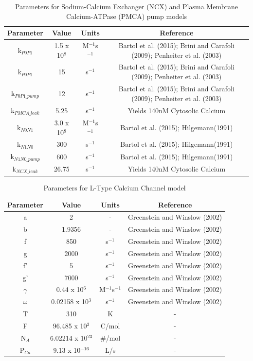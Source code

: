 \documentclass[12pt]{ucsddissertation}
\begin{document}
\begin{table}[h]
\centering
\caption{Parameters for Sodium-Calcium Exchanger (NCX) 
and Plasma Membrane Calcium-ATPase (PMCA) pump models}
\begin{tabular}{cccc}
\hline
\textbf{Parameter} & \textbf{Value} & \textbf{Units} & \textbf{
Reference} \\
\hline
k$_{P0P1}$ & 1.5 x 10$^{8}$ & M$^{-1}$s$^{-1}$ & Bartol et 
al. (2015); Brini and Carafoli (2009); Penheiter et al. (2003) \\
\hline
k$_{P0P1}$ & 15 & s$^{-1}$ & Bartol et al. (2015); Brini and 
Carafoli (2009); Penheiter et al. (2003) \\
\hline
k$_{P0P1\_pump}$ & 12 & s$^{-1}$ & Bartol et al. (2015); Brini and 
Carafoli (2009); Penheiter et al. (2003) \\
\hline
k$_{PMCA\_leak}$ & 5.25 & s$^{-1}$ & Yields 140nM Cytosolic 
Calcium \\
\hline
k$_{N0N1}$ & 3.0 x 10$^{8}$ & M$^{-1}$s$^{-1}$ & Bartol et 
al. (2015); Hilgemann(1991) \\
\hline
k$_{N1N0}$ & 300 & s$^{-1}$ & Bartol et al. (2015); Hilgemann(1991) 
\\
\hline
k$_{N1N0\_pump}$ & 600 & s$^{-1}$ & Bartol et al. (2015); 
Hilgemann(1991) \\
\hline
k$_{NCX\_leak}$ & 26.75 & s$^{-1}$ & Yields 140nM Cytosolic 
Calcium \\
\hline
\end{tabular}
\end{table}




\begin{table}[h]
\centering
\caption{Parameters for L-Type Calcium Channel model}
\begin{tabular}{cccc}
\hline
\textbf{Parameter} & \textbf{Value} & \textbf{Units} & \textbf{
Reference} \\
\hline
a & 2 & - & Greenstein and Winslow (2002) \\
\hline
b & 1.9356 & - & Greenstein and Winslow (2002) \\
\hline
f & 850 & s$^{-1}$ & Greenstein and Winslow (2002) \\
\hline
g & 2000 & s$^{-1}$ & Greenstein and Winslow (2002) \\
\hline
f' & 5 & s$^{-1}$ & Greenstein and Winslow (2002) \\
\hline
g' & 7000 & s$^{-1}$ & Greenstein and Winslow (2002) \\
\hline
$\gamma$ & 0.44 x 10$^{6}$ & M$^{-1}$s$^{-1}$ & Greenstein and 
Winslow (2002) \\
\hline
$\omega$ & 0.02158 x 10$^{3}$ & s$^{-1}$ & Greenstein and Winslow (2002) 
\\
\hline
T & 310 & K & - \\
\hline
F & 96.485 x 10$^{3}$ & C/mol & - \\
\hline
N$_{A}$ & 6.02214 x 10$^{23}$ & \#/mol & - \\
\hline
P$_{Ca}$ & 9.13 x 10$^{-16}$ & L/s & - \\
\hline
\end{tabular}
\end{table}
\end{document}

